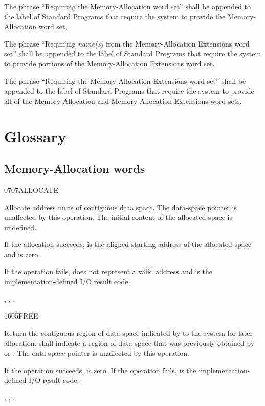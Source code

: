 The phrase ``Requiring the Memory-Allocation word set'' shall be
appended to the label of Standard Programs that require the system
to provide the Memory-Allocation word set.

The phrase ``Requiring \emph{name(s)} from the Memory-Allocation
Extensions word set'' shall be appended to the label of Standard
Programs that require the system to provide portions of the
Memory-Allocation Extensions word set.

The phrase ``Requiring the Memory-Allocation Extensions word set''
shall be appended to the label of Standard Programs that require
the system to provide all of the Memory-Allocation and
Memory-Allocation Extensions word sets.


\section{Glossary} %

\subsection{Memory-Allocation words} %


\begin{worddef}{0707}{ALLOCATE}
\item {}

	Allocate  address units of contiguous data space. The
	data-space pointer is unaffected by this operation. The initial
	content of the allocated space is undefined.

	If the allocation succeeds,  is the aligned
	starting address of the allocated space and  is
	zero.

	If the operation fails,  does not represent a valid
	address and  is the implementation-defined I/O result
	code.

\see {},
	,
	.
\end{worddef}


\begin{worddef}{1605}{FREE}
\item {}

	Return the contiguous region of data space indicated by
	 to the system for later allocation. 
	shall indicate a region of data space that was previously
	obtained by  or . The data-space
	pointer is unaffected by this operation.

	If the operation succeeds,  is zero. If the operation
	fails,  is the implementation-defined I/O result code.

\see {},
	,
	.
\end{worddef}


